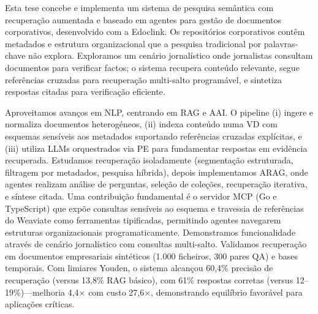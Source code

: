 \glsresetall
\noindent
Esta tese concebe e implementa um sistema de pesquisa semântica com recuperação aumentada e baseado em agentes para gestão de documentos corporativos, desenvolvido com a Edoclink. Os repositórios corporativos contêm metadados e estrutura organizacional que a pesquisa tradicional por palavras-chave não explora. Exploramos um cenário jornalístico onde jornalistas consultam documentos para verificar factos; o sistema recupera conteúdo relevante, segue referências cruzadas para recuperação multi-salto programável, e sintetiza respostas citadas para verificação eficiente.

Aproveitamos avanços em \gls{NLP}, centrando em \gls{RAG} e \gls{AAI}. O pipeline (i) ingere e normaliza documentos heterogéneos, (ii) indexa conteúdo numa \gls{VD} com esquemas sensíveis aos metadados suportando referências cruzadas explícitas, e (iii) utiliza \glspl{LLM} orquestrados via \gls{PE} para fundamentar respostas em evidência recuperada. Estudamos recuperação isoladamente (segmentação estruturada, filtragem por metadados, pesquisa híbrida), depois implementamos \gls{ARAG}, onde agentes realizam análise de perguntas, seleção de coleções, recuperação iterativa, e síntese citada.
Uma contribuição fundamental é o servidor \gls{MCP} (Go e TypeScript) que expõe consultas sensíveis ao esquema e travessia de referências do Weaviate como ferramentas tipificadas, permitindo agentes navegarem estruturas organizacionais programaticamente. Demonstramos funcionalidade através de cenário jornalístico com consultas multi-salto. Validamos recuperação em documentos empresariais sintéticos (1.000 ficheiros, 300 pares QA) e bases temporais. Com limiares Youden, o sistema alcançou 60,4\% precisão de recuperação (versus 13,8\% RAG básico), com 61\% respostas corretas (versus 12–19\%)—melhoria 4,4× com custo 27,6×, demonstrando equilíbrio favorável para aplicações críticas.





